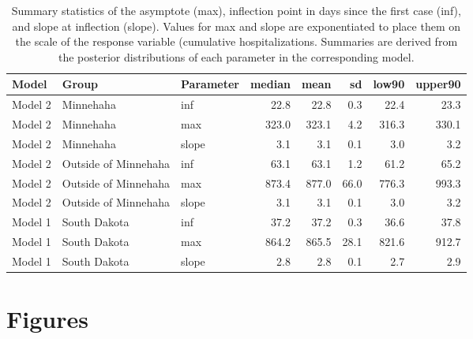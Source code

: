 \documentclass[
]{article}
\begin{document}
\begin{table}[!h]

\caption{\label{tab:unnamed-chunk-2}Summary statistics of the asymptote (max), inflection point in days since the first case (inf), and slope at inflection (slope). Values for max and slope are exponentiated to place them on the scale of the response variable (cumulative hospitalizations. Summaries are derived from the posterior distributions of each parameter in the corresponding model.}
\centering
\begin{tabular}[t]{lllrrrrr}
\toprule
Model & Group & Parameter & median & mean & sd & low90 & upper90\\
\midrule
\rowcolor{gray!6}  Model 2 & Minnehaha & inf & 22.8 & 22.8 & 0.3 & 22.4 & 23.3\\
Model 2 & Minnehaha & max & 323.0 & 323.1 & 4.2 & 316.3 & 330.1\\
\rowcolor{gray!6}  Model 2 & Minnehaha & slope & 3.1 & 3.1 & 0.1 & 3.0 & 3.2\\
Model 2 & Outside of Minnehaha & inf & 63.1 & 63.1 & 1.2 & 61.2 & 65.2\\
\rowcolor{gray!6}  Model 2 & Outside of Minnehaha & max & 873.4 & 877.0 & 66.0 & 776.3 & 993.3\\
\addlinespace
Model 2 & Outside of Minnehaha & slope & 3.1 & 3.1 & 0.1 & 3.0 & 3.2\\
\rowcolor{gray!6}  Model 1 & South Dakota & inf & 37.2 & 37.2 & 0.3 & 36.6 & 37.8\\
Model 1 & South Dakota & max & 864.2 & 865.5 & 28.1 & 821.6 & 912.7\\
\rowcolor{gray!6}  Model 1 & South Dakota & slope & 2.8 & 2.8 & 0.1 & 2.7 & 2.9\\
\bottomrule
\end{tabular}
\end{table}

\hypertarget{figures}{%
\section{Figures}\label{figures}}
\end{document}
